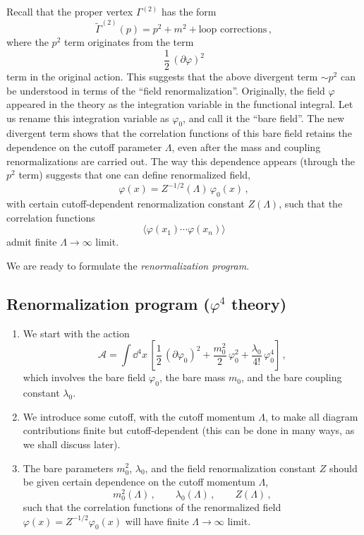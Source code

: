 Recall that the proper vertex $\Gamma^{(2)}$ has the form
\[
\tilde\Gamma^{(2)}(p)=p^2+m^2+\text{loop corrections}\,,
\]
where the $p^2$ term originates from the term
\[
\frac12\,(\partial\varphi)^2
\]
term in the original action. This suggests that the above divergent term
$\sim p^2$ can be understood in terms of the ``field renormalization''.
Originally, the field $\varphi$ appeared in the theory as the integration
variable in the functional integral. Let us rename this integration variable as
$\varphi_0$, and call it the ``bare field''. The new divergent term shows that
the correlation functions of this bare field retains the dependence on the
cutoff parameter $\Lambda$, even after the mass and coupling renormalizations
are carried out. The way this dependence appears (through the $p^2$ term)
suggests that one can define renormalized field,
\[
\varphi(x)=Z^{-1/2}(\Lambda)\,\varphi_0(x)\,,
\]
with certain cutoff-dependent renormalization constant $Z(\Lambda)$, such that
the correlation functions
\[
\bigl\langle\varphi(x_1)\cdots\varphi(x_n)\bigr\rangle
\]
admit finite $\Lambda\to\infty$ limit.

We are ready to formulate the \emph{renormalization program}.

\subsection*{Renormalization program (\texorpdfstring{$\varphi^4$}{phi**4} theory)}
\begin{enumerate}
\item We start with the action
\[
\mathcal A=\int \dd^4x\,\left[\frac12\,(\partial\varphi_0)^2+\frac{m_0^2}2\,\varphi_0^2+\frac{\lambda_0}{4!}\,\varphi_0^4\right]\,,
\]
which involves the bare field $\varphi_0$, the bare mass $m_0$, and the bare
coupling constant $\lambda_0$.

\item We introduce some cutoff, with the cutoff momentum $\Lambda$, to make all
diagram contributions finite but cutoff-dependent (this can be done in many
ways, as we shall discuss later).

\item The bare parameters $m_0^2$, $\lambda_0$, and the field renormalization
constant $Z$ should be given certain dependence on the cutoff momentum
$\Lambda$,
\[
m_0^2(\Lambda)\,,\qquad\lambda_0(\Lambda)\,,\qquad Z(\Lambda)\,,
\]
such that the correlation functions of the renormalized field
$\varphi(x)=Z^{-1/2}\varphi_0(x)$ will have finite $\Lambda\to\infty$ limit.
\end{enumerate}

